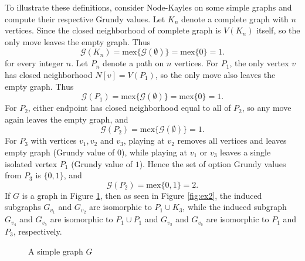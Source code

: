 \documentclass[12pt]{elsarticle}
\newtheorem*{theorem A}{Theorem A}
\newtheorem*{theorem B}{N\"olker's Theorem}
\theoremstyle{remark}
\theoremstyle{remark}
\theoremstyle{definition}
\begin{document}
To illustrate these definitions, consider Node-Kayles on some simple graphs and compute their respective Grundy values. Let $K_n$ denote a complete graph with $n$ vertices. Since the closed neighborhood of complete graph is $V(K_n)$ itself, so the only move leaves the empty graph. Thus
\begin{equation*}
	\mathcal{G}(K_n) = \mathrm{mex}\{\mathcal{G}(\emptyset)\} = \mathrm{mex}\{0\} = 1.
\end{equation*}
for every integer $n$. Let $P_n$ denote a path on $n$ vertices. For $P_1$, the only vertex $v$ has closed neighborhood $N[v] = V(P_1)$, so the only move also leaves the empty graph. Thus
\begin{equation*}
	\mathcal{G}(P_1) = \mathrm{mex}\{\mathcal{G}(\emptyset)\} = \mathrm{mex}\{0\} = 1.
\end{equation*}
For $P_2$, either endpoint has closed neighborhood equal to all of $P_2$, so any move again leaves the empty graph, and
\begin{equation*}
	\mathcal{G}(P_2) = \mathrm{mex}\{\mathcal{G}(\emptyset)\} = 1.
\end{equation*}
For $P_3$ with vertices $v_1,v_2$ and $v_3$, playing at $v_2$ removes all vertices and leaves empty graph (Grundy value of $0$), while playing at $v_1$ or $v_3$ leaves a single isolated vertex $P_1$ (Grundy value of $1$). Hence the set of option Grundy values from $P_3$ is $\{0,1\}$, and
\begin{equation*}
	\mathcal{G}(P_2) = \mathrm{mex}\{0,1\} = 2.
\end{equation*}
If $G$ is a graph in Figure \ref{fig:ex1}, then as seen in Figure \ref{fig:ex2}, the induced subgraphs $G_{v_1}$ and $G_{v_2}$ are isomorphic to $P_1 \cup K_3$, while the induced subgraph $G_{v_4}$ and $G_{v_5}$ are isomorphic to $P_1 \cup P_1$ and $G_{v_3}$ and $G_{v_6}$ are isomorphic to $P_1$ and $P_3$, respectively.
\begin{figure}[!ht]
	\centering
	\caption{A simple graph $G$ \label{fig:ex1}}
\end{figure}
\end{document}
